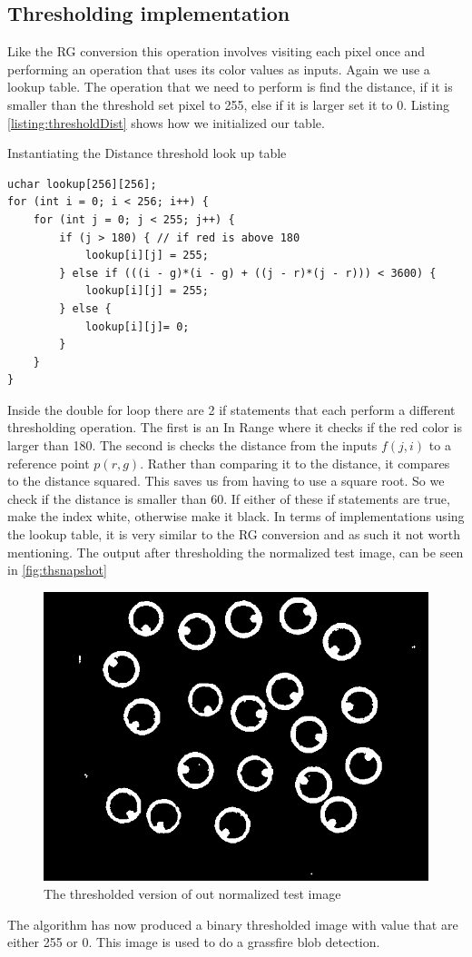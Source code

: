\subsection{Thresholding implementation}
Like the RG conversion this operation involves visiting each pixel once and performing an operation that uses its color values as inputs. Again we use a lookup table. The operation that we need to perform is find the distance, if it is smaller than the threshold set pixel to 255, else if it is larger set it to 0. Listing \ref{listing:thresholdDist} shows how we initialized our table.

\begin{listing}[H]
	\caption{Instantiating the Distance threshold look up table}
	\label{listing:thresholdDist}
	\begin{verbatim}
uchar lookup[256][256];
for (int i = 0; i < 256; i++) {
	for (int j = 0; j < 255; j++) {
		if (j > 180) { // if red is above 180
			lookup[i][j] = 255;
		} else if (((i - g)*(i - g) + ((j - r)*(j - r))) < 3600) {
			lookup[i][j] = 255;
		} else {
			lookup[i][j]= 0;
		}
	}
}
\end{verbatim}
\end{listing}

Inside the double for loop there are 2 if statements that each perform a different thresholding operation. The first is an In Range where it checks if the red color is larger than 180. The second is checks the distance from the inputs $f(j,i)$ to a reference point $p(r,g)$. Rather than comparing it to the distance, it compares to the distance squared. This saves us from having to use a square root. So we check if the distance is smaller than 60. If either of these if statements are true, make the index white, otherwise make it black.
In terms of implementations using the lookup table, it is very similar to the RG conversion and as such it not worth mentioning. The output after thresholding the normalized test image, can be seen in \autoref{fig:thsnapshot}\\
\begin{figure}[H]
	\centering
	\includegraphics[width=0.6\linewidth]{figure/Analysis/thresholded.png}
	\caption{The thresholded version of out normalized test image}
	\label{fig:thsnapshot}
\end{figure} 
The algorithm has now produced a binary thresholded image with value that are either 255 or 0. This image is used to do a grassfire blob detection. 
